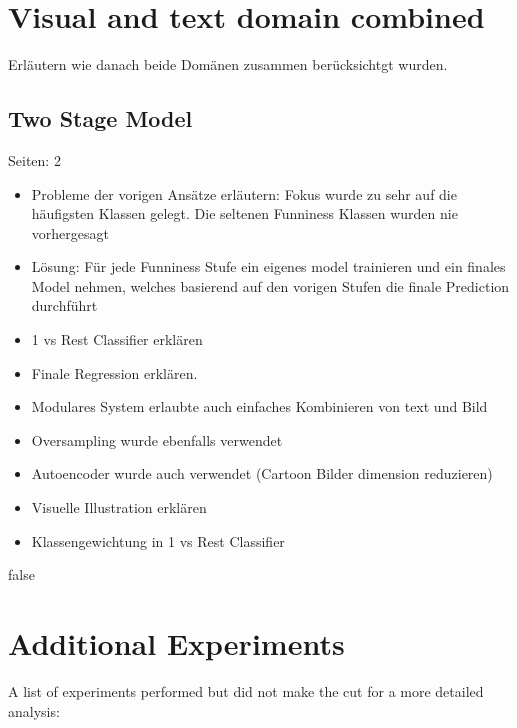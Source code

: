\documentclass[draft,final,oneside]{vutinfth} %
\begin{document}
\section{Visual and text domain combined}

Erläutern wie danach beide Domänen zusammen berücksichtgt wurden.

\subsection{Two Stage Model}

Seiten: 2

\begin{itemize}

\item Probleme der vorigen Ansätze erläutern: Fokus wurde zu sehr auf die häufigsten Klassen gelegt. Die seltenen Funniness Klassen wurden nie vorhergesagt
\item Lösung: Für jede Funniness Stufe ein eigenes model trainieren und ein finales Model nehmen, welches basierend auf den vorigen Stufen die finale Prediction durchführt
\item 1 vs Rest Classifier erklären
\item Finale Regression erklären.
\item Modulares System erlaubte auch einfaches Kombinieren von text und Bild
\item Oversampling wurde ebenfalls verwendet
\item Autoencoder wurde auch verwendet (Cartoon Bilder dimension reduzieren)
\item Visuelle Illustration erklären
\item Klassengewichtung in 1 vs Rest Classifier

\end{itemize}

\if false
\section{Additional Experiments}
A list of experiments performed but did not make the cut for a more detailed analysis:
\end{document}
